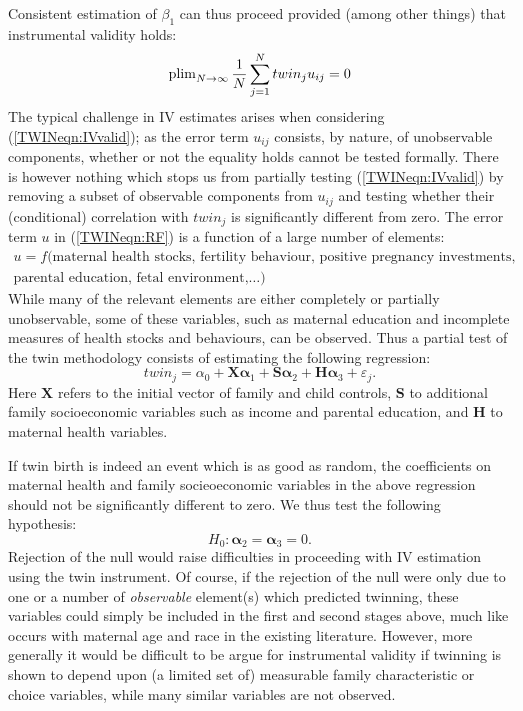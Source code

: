 Consistent estimation of $\beta_1$ can thus proceed provided (among other
things) that instrumental validity holds:
\begin{equation}
\label{TWINeqn:IVvalid}
\operatorname{plim}_{N\to \infty} \frac{1}{N}\sum_{j=1}^N twin_ju_{ij}=0
\end{equation}
The typical challenge in IV estimates arises when considering 
(\ref{TWINeqn:IVvalid}); as the error term $u_{ij}$ consists, by nature, of 
unobservable components, whether or not the equality holds cannot be tested 
formally.  There is however nothing which stops us from partially testing 
(\ref{TWINeqn:IVvalid}) by removing a subset of observable components from $u_{ij}$
and testing whether their (conditional) correlation with $twin_j$ is 
significantly different from zero. The error term $u$ in (\ref{TWINeqn:RF}) 
is a function of a large number of elements:
\begin{equation}
\label{TWINeqn:IVbias}
\begin{split}
u=f(\text{maternal health stocks, fertility behaviour, positive pregnancy investments,}  \\
\text{parental education, fetal environment,}\ldots)
\end{split}
\end{equation}
While many of the relevant elements are either completely or partially 
unobservable, some of these variables, such as maternal education and 
incomplete measures of health stocks and behaviours, can be observed.  Thus a 
partial test of the twin methodology consists of estimating the following 
regression:
\begin{equation}
\label{TWINeqn:twinreg}
twin_{j}=\alpha_0 + \bm{X}\bm{\alpha}_1 + \bm{S}\bm{\alpha}_2
                  + \bm{H}\bm{\alpha}_3 + \varepsilon_{j}.
\end{equation}
Here $\bm{X}$ refers to the initial vector of family and child controls, $\bm{S}$
to additional family socioeconomic variables such as income and parental 
education, and $\bm{H}$ to maternal health variables.  

If twin birth is indeed an event which is as good as random, the coefficients
on maternal health and family socieoeconomic variables in the above regression
should not be significantly different to zero.  We thus test the following 
hypothesis:
\begin{equation}
\label{TWINeqn:twintest}
H_0: \bm{\alpha}_2 = \bm{\alpha}_3 = 0.
\end{equation}
Rejection of the null would raise difficulties in proceeding with IV estimation 
using the twin instrument. Of course, if the rejection of the null were only due 
to one or a number of \emph{observable} element(s) which predicted twinning, 
these variables could simply be included in the first and second stages above, 
much like occurs with maternal age and race in the existing literature.  However, 
more generally it would be difficult to be argue for instrumental validity if 
twinning is shown to depend upon (a limited set of) measurable family 
characteristic or choice variables, while many similar variables are not observed.

